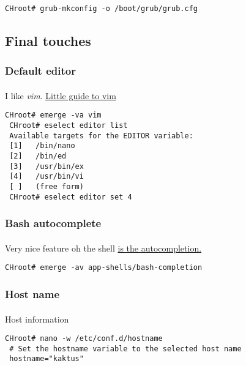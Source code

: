 \documentclass[10pt,a4paper]{article}
\begin{document}
                    \begin{lstlisting}[style=BashInputCHRoot]
 CHroot# grub-mkconfig -o /boot/grub/grub.cfg
                    \end{lstlisting}

            \newpage
            \subsection{Final touches}

                \subsubsection{Default editor}

                    \paragraph{} I like \textit{vim}. \href{https://wiki.gentoo.org/wiki/Vim/Guide}{Little guide to vim}
                    \begin{lstlisting}[style=BashInputCHRoot]
 CHroot# emerge -va vim
 CHroot# eselect editor list
 Available targets for the EDITOR variable:
 [1]   /bin/nano
 [2]   /bin/ed
 [3]   /usr/bin/ex
 [4]   /usr/bin/vi
 [ ]   (free form)
 CHroot# eselect editor set 4
                    \end{lstlisting}

                \newpage
                \subsubsection{Bash autocomplete}
                    \paragraph{} Very nice feature oh the shell  \href{https://wiki.gentoo.org/wiki/Bash#Tab_completion}{is the autocompletion.}

                    \begin{lstlisting}[style=BashInputCHRoot]
 CHroot# emerge -av app-shells/bash-completion
                    \end{lstlisting}

                \newpage
                \subsubsection{Host name}
                    \paragraph{} Host information
                    \begin{lstlisting}[style=BashInputCHRoot]
 CHroot# nano -w /etc/conf.d/hostname
 # Set the hostname variable to the selected host name
 hostname="kaktus"
                    \end{lstlisting}
\end{document}
